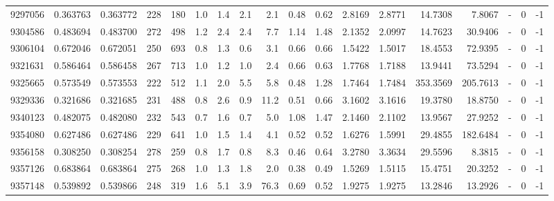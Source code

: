 \begin{tabular}{rrrrrrrrrrrrrrrlrr}
   9297056 & 0.363763 &   0.363772 &  228 &  180 &      1.0 &      1.4 &     2.1 &      2.1 &       0.48 &        0.62 &  2.8169 &  2.8771 &   14.7308 &    7.8067 &             - &        0 &         -1 \\
   9304586 & 0.483694 &   0.483700 &  272 &  498 &      1.2 &      2.4 &     2.4 &      7.7 &       1.14 &        1.48 &  2.1352 &  2.0997 &   14.7623 &   30.9406 &             - &        0 &         -1 \\
   9306104 & 0.672046 &   0.672051 &  250 &  693 &      0.8 &      1.3 &     0.6 &      3.1 &       0.66 &        0.66 &  1.5422 &  1.5017 &   18.4553 &   72.9395 &             - &        0 &         -1 \\
   9321631 & 0.586464 &   0.586458 &  267 &  713 &      1.0 &      1.2 &     1.0 &      2.4 &       0.66 &        0.63 &  1.7768 &  1.7188 &   13.9441 &   73.5294 &             - &        0 &         -1 \\
   9325665 & 0.573549 &   0.573553 &  222 &  512 &      1.1 &      2.0 &     5.5 &      5.8 &       0.48 &        1.28 &  1.7464 &  1.7484 &  353.3569 &  205.7613 &             - &        0 &         -1 \\
   9329336 & 0.321686 &   0.321685 &  231 &  488 &      0.8 &      2.6 &     0.9 &     11.2 &       0.51 &        0.66 &  3.1602 &  3.1616 &   19.3780 &   18.8750 &             - &        0 &         -1 \\
   9340123 & 0.482075 &   0.482080 &  232 &  543 &      0.7 &      1.6 &     0.7 &      5.0 &       1.08 &        1.47 &  2.1460 &  2.1102 &   13.9567 &   27.9252 &             - &        0 &         -1 \\
   9354080 & 0.627486 &   0.627486 &  229 &  641 &      1.0 &      1.5 &     1.4 &      4.1 &       0.52 &        0.52 &  1.6276 &  1.5991 &   29.4855 &  182.6484 &             - &        0 &         -1 \\
   9356158 & 0.308250 &   0.308254 &  278 &  259 &      0.8 &      1.7 &     0.8 &      8.3 &       0.46 &        0.64 &  3.2780 &  3.3634 &   29.5596 &    8.3815 &             - &        0 &         -1 \\
   9357126 & 0.683864 &   0.683864 &  275 &  268 &      1.0 &      1.3 &     1.8 &      2.0 &       0.38 &        0.49 &  1.5269 &  1.5115 &   15.4751 &   20.3252 &             - &        0 &         -1 \\
   9357148 & 0.539892 &   0.539866 &  248 &  319 &      1.6 &      5.1 &     3.9 &     76.3 &       0.69 &        0.52 &  1.9275 &  1.9275 &   13.2846 &   13.2926 &             - &        0 &         -1 \\

\end{tabular}
